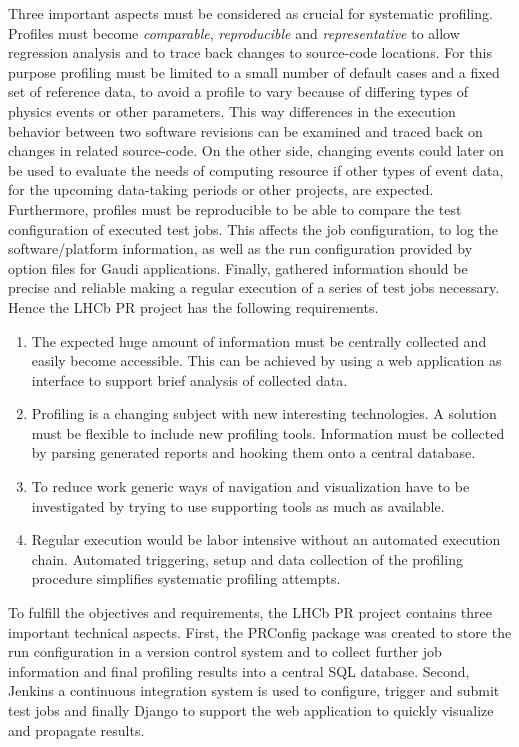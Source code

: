 \documentclass[a4paper]{jpconf}
\begin{document}
Three important aspects must be considered as crucial for systematic profiling. Profiles must become \textit{comparable}, \textit{reproducible} and \textit{representative} to allow regression analysis and to trace back changes to source-code locations. For this purpose profiling must be limited to a small number of default cases and a fixed set of reference data, to avoid a profile to vary because of differing types of physics events or other parameters. This way differences in the execution behavior between two software revisions can be examined and traced back on changes in related source-code. On the other side, changing events could later on be used to evaluate the needs of computing resource if other types of event data, for the upcoming data-taking periods or other projects, are expected.
\newline
Furthermore, profiles must be reproducible to be able to compare the test configuration of executed test jobs. This affects the job configuration, to log the software/platform information, as well as the run configuration provided by option files for Gaudi applications. Finally, gathered information should be precise and reliable making a regular execution of a series of test jobs necessary.
\newline
Hence the LHCb PR project has the following requirements.
\begin{enumerate}
 \item The expected huge amount of information must be centrally collected and easily become accessible. This can be achieved by using a web application as interface to support brief analysis of collected data.
 \item Profiling is a changing subject with new interesting technologies. A solution must be flexible to include new profiling tools. Information must be collected by parsing generated reports and hooking them onto a central database.
 \item To reduce work generic ways of navigation and visualization have to be investigated by trying to use supporting tools as much as available.
 \item Regular execution would be labor intensive without an automated execution chain. Automated triggering, setup and data collection of the profiling procedure simplifies systematic profiling attempts.
\end{enumerate}
To fulfill the objectives and requirements, the LHCb PR project contains three important technical aspects. First, the PRConfig package was created to store the run configuration in a version control system and to collect further job information and final profiling results into a central SQL database. Second, Jenkins \cite{jenkins} a continuous integration system is used to configure, trigger and submit test jobs and finally Django \cite{django} to support the web application to quickly visualize and propagate results. 
\end{document}

